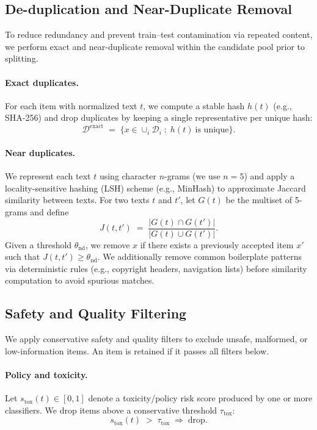 \documentclass[11pt]{article}
\begin{document}
\subsection{De-duplication and Near-Duplicate Removal}
\label{subsec:construct-dedup}
To reduce redundancy and prevent train--test contamination via repeated content, we perform exact and near-duplicate removal within the candidate pool prior to splitting.

\paragraph{Exact duplicates.}
For each item with normalized text $t$, we compute a stable hash $h(t)$ (e.g., SHA-256) and drop duplicates by keeping a single representative per unique hash:
\[
\mathcal{D}^{\text{exact}} \;=\; \{x \in \cup_i \mathcal{D}_i \;:\; h(t)\ \text{is unique}\}.
\]

\paragraph{Near duplicates.}
We represent each text $t$ using character $n$-grams (we use $n=5$) and apply a locality-sensitive hashing (LSH) scheme (e.g., MinHash) to approximate Jaccard similarity between texts. For two texts $t$ and $t'$, let $G(t)$ be the multiset of 5-grams and define
\[
J(t,t') \;=\; \frac{\lvert G(t)\cap G(t')\rvert}{\lvert G(t)\cup G(t')\rvert}.
\]
Given a threshold $\theta_{\text{nd}}$, we remove $x$ if there exists a previously accepted item $x'$ such that $J(t,t') \ge \theta_{\text{nd}}$.
We additionally remove common boilerplate patterns via deterministic rules (e.g., copyright headers, navigation lists) before similarity computation to avoid spurious matches.

\subsection{Safety and Quality Filtering}
\label{subsec:construct-filter}
We apply conservative safety and quality filters to exclude unsafe, malformed, or low-information items. An item is retained if it passes all filters below.

\paragraph{Policy and toxicity.}
Let $s_{\text{tox}}(t)\in[0,1]$ denote a toxicity/policy risk score produced by one or more classifiers. We drop items above a conservative threshold $\tau_{\text{tox}}$:
\[
s_{\text{tox}}(t) \;>\; \tau_{\text{tox}} \;\Rightarrow\; \text{drop}.
\]
\end{document}
